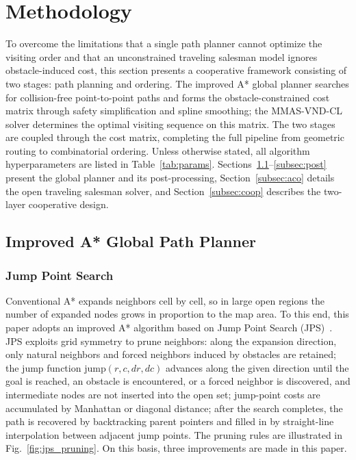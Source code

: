 \section{Methodology}
\label{sec:method}

To overcome the limitations that a single path planner cannot optimize the visiting order and that an unconstrained traveling salesman model ignores obstacle-induced cost, this section presents a cooperative framework consisting of two stages: path planning and ordering. The improved A* global planner searches for collision-free point-to-point paths and forms the obstacle-constrained cost matrix through safety simplification and spline smoothing; the MMAS-VND-CL solver determines the optimal visiting sequence on this matrix. The two stages are coupled through the cost matrix, completing the full pipeline from geometric routing to combinatorial ordering. Unless otherwise stated, all algorithm hyperparameters are listed in Table~\textcolor{blue}{\ref{tab:params}}. Sections~\textcolor{blue}{\ref{subsec:jps}}--\textcolor{blue}{\ref{subsec:post}} present the global planner and its post-processing, Section~\textcolor{blue}{\ref{subsec:aco}} details the open traveling salesman solver, and Section~\textcolor{blue}{\ref{subsec:coop}} describes the two-layer cooperative design.

\subsection{Improved A* Global Path Planner}
\label{subsec:jps}

\subsubsection{Jump Point Search}

Conventional A* expands neighbors cell by cell, so in large open regions the number of expanded nodes grows in proportion to the map area. To this end, this paper adopts an improved A* algorithm based on Jump Point Search (JPS)~\textcolor{blue}{\cite{ref11,ref12}}. JPS exploits grid symmetry to prune neighbors: along the expansion direction, only natural neighbors and forced neighbors induced by obstacles are retained; the jump function $\mathrm{jump}(r, c, dr, dc)$ advances along the given direction until the goal is reached, an obstacle is encountered, or a forced neighbor is discovered, and intermediate nodes are not inserted into the open set; jump-point costs are accumulated by Manhattan or diagonal distance; after the search completes, the path is recovered by backtracking parent pointers and filled in by straight-line interpolation between adjacent jump points. The pruning rules are illustrated in Fig.~\textcolor{blue}{\ref{fig:jps_pruning}}. On this basis, three improvements are made in this paper.

